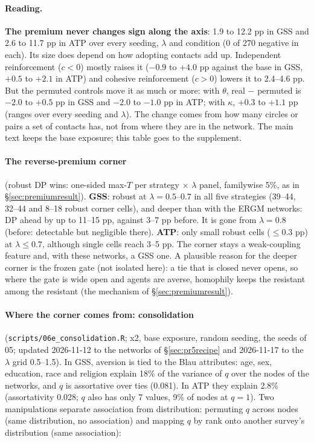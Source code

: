 \documentclass[11pt,a4paper]{article}
\newcommand{\code}[1]{\texttt{#1}}
\begin{document}
\paragraph{Reading.} \textbf{The premium never changes sign along the axis}: 1.9 to 12.2 pp in
GSS and 2.6 to 11.7 pp in ATP over every seeding, $\lambda$ and condition (0 of 270 negative
in each). Its size does depend on how adopting contacts add up. Independent reinforcement
($c < 0$) mostly raises it ($-0.9$ to $+4.0$ pp against the base in GSS, $+0.5$ to $+2.1$ in
ATP) and cohesive reinforcement ($c > 0$) lowers it to 2.4--4.6 pp. But the permuted controls
move it as much or more: with $\theta$, real $-$ permuted is $-2.0$ to $+0.5$ pp in GSS and
$-2.0$ to $-1.0$ pp in ATP; with $\kappa$, $+0.3$ to $+1.1$ pp (ranges over every seeding and
$\lambda$). The change comes from how many circles or pairs a set of contacts has, not from
where they are in the network. The main text keeps the base exposure; this table goes to the
supplement.

\paragraph{The reverse-premium corner} (robust DP wins: one-sided max-$T$ per strategy
$\times$ $\lambda$ panel, familywise 5\%, as in \S\ref{sec:premiumresult}). \textbf{GSS}: robust
at $\lambda = 0.5$--$0.7$ in all five strategies (39--44, 32--44 and 8--18 robust corner cells),
and deeper than with the ERGM networks: DP ahead by up to 11--15 pp, against 3--7 pp before.
It is gone from $\lambda = 0.8$ (before: detectable but negligible there). \textbf{ATP}: only
small robust cells ($\le 0.3$ pp) at $\lambda \le 0.7$, although single cells reach 3--5 pp. The
corner stays a weak-coupling feature and, with these networks, a GSS one. A plausible reason
for the deeper corner is the frozen gate (not isolated here): a tie that is closed never opens, so where the gate is wide open and agents are
averse, homophily keeps the resistant among the resistant (the mechanism of
\S\ref{sec:premiumresult}).

\paragraph{Where the corner comes from: consolidation} \label{sec:consolidation}
(\code{scripts/06e\_consolidation.R}; x2, base exposure, random seeding, the seeds of 05; updated
2026-11-12 to the networks of \S\ref{sec:pr5recipe} and 2026-11-17 to the $\lambda$ grid 0.5--1.5). In GSS, aversion is tied to the Blau attributes:
age, sex, education, race and religion explain 18\% of the variance of $q$ over the nodes of the
networks, and $q$ is assortative over ties (0.081). In ATP they explain 2.8\% (assortativity 0.028;
$q$ also has only 7 values, 9\% of nodes at $q = 1$). Two manipulations separate association from
distribution: permuting $q$ across nodes (same distribution, no association) and mapping $q$ by
rank onto another survey's distribution (same association):
\end{document}
